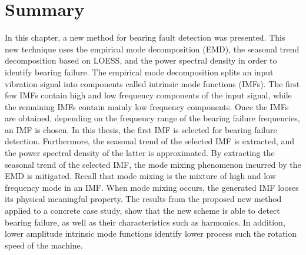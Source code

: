 \documentclass[../Main/thesis.tex]{subfiles}
\begin{document}
\section{Summary}
\label{sec:limitation}
In this chapter, a new method for bearing fault detection was presented. This new technique uses the empirical mode decomposition (EMD), the seasonal trend decomposition based on LOESS, and the power spectral density in order to identify bearing failure. The empirical mode decomposition splits an input vibration signal into components called intrinsic mode functions (IMFs). The first few IMFs contain high and low frequency components of the input signal, while the remaining IMFs contain mainly low frequency components.
\justify
Once the IMFs are obtained, depending on the frequency range of the bearing failure frequencies, an IMF is chosen. In this thesis, the first IMF is selected for bearing failure detection. Furthermore, the seasonal trend of the selected IMF is extracted, and the power spectral density of the latter is approximated. By extracting the seasonal trend of the selected IMF, the mode mixing phenomenon incurred by the EMD is mitigated. Recall that mode mixing is the mixture of high and low frequency mode in an IMF. When mode mixing occurs, the generated IMF looses its physical meaningful property. 
\justify
The results from the proposed new method applied to a concrete case study, show that the new scheme is able to detect bearing failure, as well as their characteristics such as harmonics. In addition, lower amplitude intrinsic mode functions identify lower process such the rotation speed of the machine.
\justify










\blankpage
\end{document}
